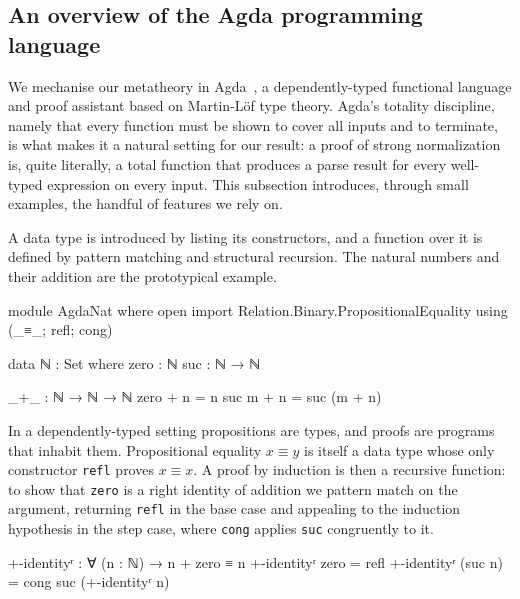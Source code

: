 \documentclass[preprint,12pt]{elsarticle}
\theoremstyle{definition}
\begin{document}
\subsection{An overview of the Agda programming language}
We mechanise our metatheory in Agda~\cite{agda}, a dependently-typed functional
language and proof assistant based on Martin-L\"of type theory. Agda's totality
discipline, namely that every function must be shown to cover all inputs and to
terminate, is what makes it a natural setting for our result: a proof of strong
normalization is, quite literally, a total function that produces a parse result
for every well-typed expression on every input. This subsection introduces,
through small examples, the handful of features we rely on.

A data type is introduced by listing its constructors, and a function over it is
defined by pattern matching and structural recursion. The natural numbers and
their addition are the prototypical example.
\begin{code}[hide]
module AgdaNat where
  open import Relation.Binary.PropositionalEquality using (_≡_; refl; cong)
\end{code}
\clearpage
\begin{code}
  data ℕ : Set where
    zero : ℕ
    suc  : ℕ → ℕ

  _+_ : ℕ → ℕ → ℕ
  zero + n = n
  suc m + n = suc (m + n)
\end{code}
In a dependently-typed setting propositions are types, and proofs are programs
that inhabit them. Propositional equality $x \equiv y$ is itself a data type whose
only constructor \lstinline{refl} proves $x \equiv x$. A proof by induction is
then a recursive function: to show that \lstinline{zero} is a right identity of
addition we pattern match on the argument, returning \lstinline{refl} in the base
case and appealing to the induction hypothesis in the step case, where
\lstinline{cong} applies \lstinline{suc} congruently to it.
\begin{code}
  +-identityʳ : ∀ (n : ℕ) → n + zero ≡ n
  +-identityʳ zero = refl
  +-identityʳ (suc n) = cong suc (+-identityʳ n)
\end{code}
\end{document}
